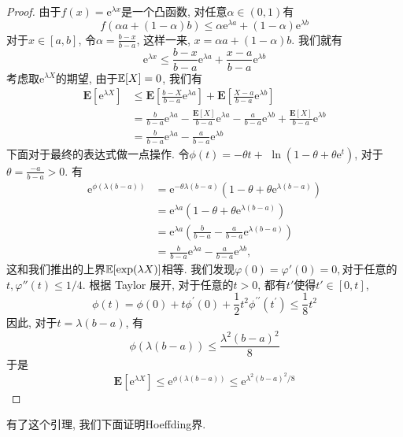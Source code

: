 \begin{proof}
    由于$f(x)=\mathrm{e}^{\lambda x}$是一个凸函数, 对任意$\alpha \in(0,1)$有
    $$
f(\alpha a+(1-\alpha) b) \leq \alpha \mathrm{e}^{\lambda a}+(1-\alpha) \mathrm{e}^{\lambda b}
$$
对于$x\in [a, b]$, 令$\alpha=\frac{b-x}{b-a}$, 这样一来, $x=\alpha a+(1-\alpha) b$. 我们就有
$$
\mathrm{e}^{\lambda x} \leq \frac{b-x}{b-a} \mathrm{e}^{\lambda a}+\frac{x-a}{b-a} \mathrm{e}^{\lambda b}
$$
考虑取$\mathrm{e}^{\lambda X}$的期望, 由于$\mathbb E[X]=0$, 我们有
$$
\begin{aligned}
\mathbf{E}\left[\mathrm{e}^{\lambda X}\right] & \leq \mathbf{E}\left[\frac{b-X}{b-a} \mathrm{e}^{\lambda a}\right]+\mathbf{E}\left[\frac{X-a}{b-a} \mathrm{e}^{\lambda b}\right] \\
& =\frac{b}{b-a} \mathrm{e}^{\lambda a}-\frac{\mathbf{E}[X]}{b-a} \mathrm{e}^{\lambda a}-\frac{a}{b-a} \mathrm{e}^{\lambda b}+\frac{\mathbf{E}[X]}{b-a} \mathrm{e}^{\lambda b} \\
& =\frac{b}{b-a} \mathrm{e}^{\lambda a}-\frac{a}{b-a} \mathrm{e}^{\lambda b}
\end{aligned}
$$
下面对于最终的表达式做一点操作. 令$\phi(t)=-\theta t+$ $\ln \left(1-\theta+\theta \mathrm{e}^t\right)$, 对于 $\theta=\frac{-a}{b-a}>0$. 有
$$
\begin{aligned}
\mathrm{e}^{\phi(\lambda(b-a))} & =\mathrm{e}^{-\theta \lambda(b-a)}\left(1-\theta+\theta \mathrm{e}^{\lambda(b-a)}\right) \\
& =\mathrm{e}^{\lambda a}\left(1-\theta+\theta \mathrm{e}^{\lambda(b-a)}\right) \\
& =\mathrm{e}^{\lambda a}\left(\frac{b}{b-a}-\frac{a}{b-a} \mathrm{e}^{\lambda(b-a)}\right) \\
& =\frac{b}{b-a} \mathrm{e}^{\lambda a}-\frac{a}{b-a} \mathrm{e}^{\lambda b},
\end{aligned}
$$
这和我们推出的上界$\mathbb E[\exp(\lambda X)]$相等. 我们发现$\varphi(0)=\varphi'(0)=0,$对于任意的$t, \varphi''(t)\leq 1/4$. 根据 Taylor 展开, 对于任意的$t>0$, 都有$t'$使得$t'\in [0,t]$, 
$$
\phi(t)=\phi(0)+t \phi^{\prime}(0)+\frac{1}{2} t^2 \phi^{\prime \prime}\left(t^{\prime}\right) \leq \frac{1}{8} t^2
$$
因此, 对于$t=\lambda (b-a)$, 有
$$
\phi(\lambda(b-a)) \leq \frac{\lambda^2(b-a)^2}{8}
$$
于是
$$
\mathbf{E}\left[\mathrm{e}^{\lambda X}\right] \leq \mathrm{e}^{\phi(\lambda(b-a))} \leq \mathrm{e}^{\lambda^2(b-a)^2 / 8}
$$
\end{proof}

有了这个引理, 我们下面证明Hoeffding界. 


